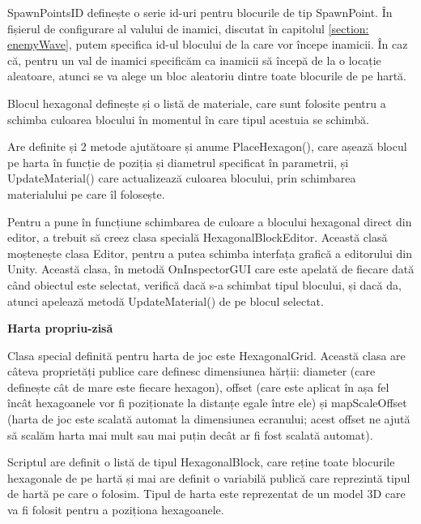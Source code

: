 \documentclass[12pt, a4paper]{article}
\begin{document}
	SpawnPointsID definește o serie id-uri pentru blocurile de tip SpawnPoint. În fișierul de configurare al valului de inamici, discutat în capitolul \ref{section: enemyWave}, putem specifica id-ul blocului de la care vor începe inamicii. În caz că, pentru un val de inamici specificăm ca inamicii să începă de la o locație aleatoare, atunci se va alege un bloc aleatoriu dintre toate blocurile de pe hartă.
	\newline
	
	Blocul hexagonal definește și o listă de materiale, care sunt folosite pentru a schimba culoarea blocului în momentul în care tipul acestuia se schimbă.
	\newline
	
	Are definite și 2 metode ajutătoare și anume PlaceHexagon(), care așează blocul pe harta în funcție de poziția și diametrul specificat în parametrii, și UpdateMaterial() care actualizează culoarea blocului, prin schimbarea materialului pe care îl folosește.
	\newline
	
	Pentru a pune în funcțiune schimbarea de culoare a blocului hexagonal direct din editor, a trebuit să creez clasa specială HexagonalBlockEditor. Această clasă moștenește clasa Editor, pentru a putea schimba interfața grafică a editorului din Unity. Această clasa, în metodă OnInspectorGUI care este apelată de fiecare dată când obiectul este selectat, verifică dacă s-a schimbat tipul blocului, și dacă da, atunci apelează metodă UpdateMaterial() de pe blocul selectat.
	\newline
	
	
	
	
	
	\textbf{Harta propriu-zisă}
	
	Clasa special definită pentru harta de joc este HexagonalGrid. Această clasa are câteva proprietăți publice care definesc dimensiunea hărții: diameter (care definește cât de mare este fiecare hexagon), offset (care este aplicat în așa fel încât hexagoanele vor fi poziționate la distanțe egale între ele) și mapScaleOffset (harta de joc este scalată automat la dimensiunea ecranului; acest offset ne ajută să scalăm harta mai mult sau mai puțin decât ar fi fost scalată automat).
	\newline
	
	Scriptul are definit o listă de tipul HexagonalBlock, care reține toate blocurile hexagonale de pe hartă și mai are definit o variabilă publică care reprezintă tipul de hartă pe care o folosim. Tipul de harta este reprezentat de un model 3D care va fi folosit pentru a poziționa hexagoanele.
	\newline
	
\end{document}
